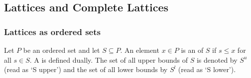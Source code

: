 \subsection{Lattices and Complete Lattices}
\subsubsection{Lattices as ordered sets}
\bit
\w Let $P$ be an ordered set and let $S \subseteq P$. An element $x \in P$ is
an  of $S$ if $s \le x$ for all $s \in S$.
A  is defined dually.
\w The set of all upper bounds of $S$ is denoted by $S^u$ (read as `S upper')
and the set of all lower bounds by $S^l$ (read as `S lower').
\eit
